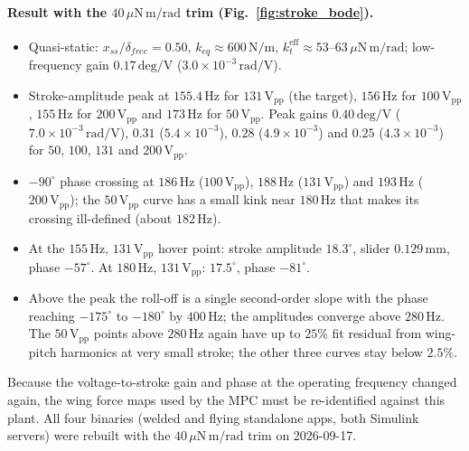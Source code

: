 \documentclass{article}
\begin{document}
\paragraph{Result with the \(40\,\mu\mathrm{N\,m/rad}\) trim (Fig.~\ref{fig:stroke_bode}).}
\begin{itemize}
    \item Quasi-static: \(x_{ss}/\delta_{free} = 0.50\), \(k_{eq} \approx 600\,\mathrm{N/m}\), \(k_t^{\mathrm{eff}} \approx 53\)--\(63\,\mu\mathrm{N\,m/rad}\); low-frequency gain \(0.17\,\mathrm{deg/V}\) (\(3.0\times 10^{-3}\,\mathrm{rad/V}\)).
    \item Stroke-amplitude peak at \(155.4\,\mathrm{Hz}\) for \(131\,\mathrm{V_{pp}}\) (the target), \(156\,\mathrm{Hz}\) for \(100\,\mathrm{V_{pp}}\), \(155\,\mathrm{Hz}\) for \(200\,\mathrm{V_{pp}}\) and \(173\,\mathrm{Hz}\) for \(50\,\mathrm{V_{pp}}\). Peak gains \(0.40\,\mathrm{deg/V}\) (\(7.0\times 10^{-3}\,\mathrm{rad/V}\)), \(0.31\) (\(5.4\times 10^{-3}\)), \(0.28\) (\(4.9\times 10^{-3}\)) and \(0.25\) (\(4.3\times 10^{-3}\)) for \(50\), \(100\), \(131\) and \(200\,\mathrm{V_{pp}}\).
    \item \(-90^\circ\) phase crossing at \(186\,\mathrm{Hz}\) (\(100\,\mathrm{V_{pp}}\)), \(188\,\mathrm{Hz}\) (\(131\,\mathrm{V_{pp}}\)) and \(193\,\mathrm{Hz}\) (\(200\,\mathrm{V_{pp}}\)); the \(50\,\mathrm{V_{pp}}\) curve has a small kink near \(180\,\mathrm{Hz}\) that makes its crossing ill-defined (about \(182\,\mathrm{Hz}\)).
    \item At the \(155\,\mathrm{Hz}\), \(131\,\mathrm{V_{pp}}\) hover point: stroke amplitude \(18.3^\circ\), slider \(0.129\,\mathrm{mm}\), phase \(-57^\circ\). At \(180\,\mathrm{Hz}\), \(131\,\mathrm{V_{pp}}\): \(17.5^\circ\), phase \(-81^\circ\).
    \item Above the peak the roll-off is a single second-order slope with the phase reaching \(-175^\circ\) to \(-180^\circ\) by \(400\,\mathrm{Hz}\); the amplitudes converge above \(280\,\mathrm{Hz}\). The \(50\,\mathrm{V_{pp}}\) points above \(280\,\mathrm{Hz}\) again have up to \(25\%\) fit residual from wing-pitch harmonics at very small stroke; the other three curves stay below \(2.5\%\).
\end{itemize}
Because the voltage-to-stroke gain and phase at the operating frequency changed again, the wing force maps used by the MPC must be re-identified against this plant. All four binaries (welded and flying standalone apps, both Simulink servers) were rebuilt with the \(40\,\mu\mathrm{N\,m/rad}\) trim on 2026-09-17.
\end{document}
